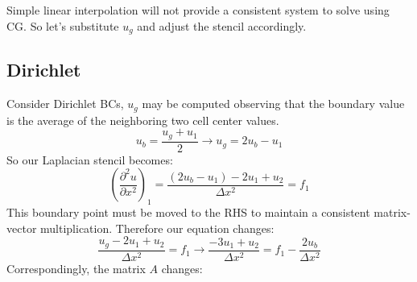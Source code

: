 \documentclass[landscape]{article}
\begin{document}
Simple linear interpolation will not provide a consistent system to solve using CG. So let's substitute $u_g$ and adjust the stencil accordingly.
\subsection{Dirichlet}
Consider Dirichlet BCs, $u_g$ may be computed observing that the boundary value is the average of the neighboring two cell center values.
\begin{equation}
    u_b = \frac{u_g + u_1}{2}
    \rightarrow
    u_g = 2u_b - u_1
\end{equation}
So our Laplacian stencil becomes:
\begin{equation}
   \left(\frac{\partial^2 u}{\partial x^2}\right)_{1} = 
   \frac{(2 u_b - u_1) - 2 u_1 + u_{2}}{\Delta x^2} = f_1
\end{equation}
This boundary point must be moved to the RHS to maintain a consistent matrix-vector multiplication. Therefore our equation changes:
\begin{equation}
   \frac{u_g - 2 u_1 + u_{2}}{\Delta x^2} = f_1
   \rightarrow
   \frac{- 3 u_1 + u_{2}}{\Delta x^2} = f_1 - \frac{2 u_b}{\Delta x^2}
\end{equation}
Correspondingly, the matrix $A$ changes:
\end{document}
